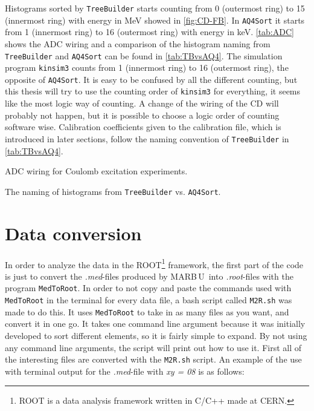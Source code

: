 \documentclass[twoside,english]{uiofysmaster/uiofysmaster}
\newcommand{\MBOU}{MAR\belowbaseline[-2pt]{a}B\stackinset{l}{3pt}{b}{-3pt}{O}{O}\,U}
\begin{document}
Histograms sorted by \texttt{TreeBuilder} starts counting from 0 (outermost ring) to 15 (innermost ring) with energy in MeV showed in \autoref{fig:CD-FB}. 
In \texttt{AQ4Sort} it starts from 1 (innermost ring) to 16 (outermost ring) with energy in keV. 
\autoref{tab:ADC} shows the ADC wiring and a comparison of the histogram naming from \texttt{TreeBuilder} and \texttt{AQ4Sort} can be found in \autoref{tab:TBvsAQ4}.
The simulation program \texttt{kinsim3} counts from 1 (innermost ring) to 16 (outermost ring), the opposite of \texttt{AQ4Sort}. 
It is easy to be confused by all the different counting, but this thesis will try to use the counting order of \texttt{kinsim3} for everything, it seems like the most logic way of counting. 
A change of the wiring of the CD will probably not happen, but it is possible to choose a logic order of counting software wise.
Calibration coefficients given to the calibration file, which is introduced in later sections, follow the naming convention of \texttt{TreeBuilder} in \autoref{tab:TBvsAQ4}.


\begin{table}[ht] 
	\centering 
	\caption{ADC wiring for Coulomb excitation experiments.}
	
	\label{tab:ADC}
\end{table}


\begin{table}[ht] 
	\centering 
	\caption{The naming of histograms from \texttt{TreeBuilder} vs. \texttt{AQ4Sort}.}
	
	\label{tab:TBvsAQ4}
\end{table}


\section{Data conversion}
In order to analyze the data in the ROOT\footnote{ROOT is a data analysis framework written in C/C++ made at CERN.} framework, the first part of the code is just to convert the \textit{.med}-files produced by \MBOU\ into \textit{.root}-files with the program \texttt{MedToRoot}. In order to not copy and paste the commands used with \texttt{MedToRoot} in the terminal for every data file, a bash script called \texttt{M2R.sh} was made to do this. It uses \texttt{MedToRoot} to take in as many files as you want, and convert it in one go. It takes one command line argument because it was initially developed to sort different elements, so it is fairly simple to expand. By not using any command line arguments, the script will print out how to use it. First all of the interesting files are converted with the \texttt{M2R.sh} script. An example of the use with terminal output for the \textit{.med}-file with \textit{xy = 08} is as follows:
\end{document}
